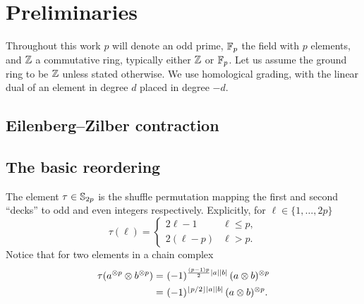
\section{Preliminaries}

Throughout this work $p$ will denote an odd prime, ${\mathbb{F}_p}$ the field with $p$ elements, and $\mathbb{Z}$ a commutative ring, typically either $\mathbb{Z}$ or ${\mathbb{F}_p}$.
Let us assume the ground ring to be $\mathbb{Z}$ unless stated otherwise.
We use homological grading, with the linear dual of an element in degree $d$ placed in degree $-d$.

\subsection{Eilenberg--Zilber contraction}

\TBW

\subsection{The basic reordering}\label{ss:reordering}

The element $\tau \in \mathbb{S}_{2p}$ is the shuffle permutation mapping the first and second ``decks'' to odd and even integers respectively.
Explicitly, for $\ell \in \{1,\dots,2p\}$
\begin{equation*}
	\tau(\ell) =
	\begin{cases}
		2\ell-1 & \ell \leq p, \\
		2(\ell-p) & \ell > p.
	\end{cases}
\end{equation*}
Notice that for two elements in a chain complex
\begin{align*}
	\tau(a^{\otimes p} \otimes b^{\otimes p}) =&\
	(-1)^{\frac{(p-1)p}{2}\lvert a\rvert\lvert b\rvert} \, (a \otimes b)^{\otimes p} \\ =&\
	(-1)^{\lfloor p/2\rfloor\lvert a\rvert\lvert b\rvert} \, (a \otimes b)^{\otimes p}.
\end{align*}
